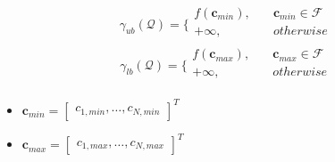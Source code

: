 \documentclass[usenames,dvipsnames]{beamer}
\begin{document}
\begin{frame}{\phantom{Tp}}
  \begin{exampleblock}{\phantom{Tp}}
   \[
     \gamma_{ub}(\mathcal{Q}) = \Bigg\{\begin{array}{ll}f(\mathbf{c}_{min}),\quad &\mathbf{c}_{min}\in\mathcal{F}\\+\infty,\quad &otherwise\\\end{array}	
    \]
    \[
     \gamma_{lb}(\mathcal{Q}) = \Bigg\{\begin{array}{ll}f(\mathbf{c}_{max}),\quad &\mathbf{c}_{max}\in\mathcal{F}\\+\infty,\quad &otherwise\\\end{array}	
     \]
  \end{exampleblock}
  \begin{itemize}
    \item $\mathbf{c}_{min} = \begin{bmatrix}c_{1,min},\dots,c_{N,min}\end{bmatrix}^T$
    \item $\mathbf{c}_{max} = \begin{bmatrix}c_{1,max},\dots,c_{N,max}\end{bmatrix}^T$
  \end{itemize}
\end{frame}
\end{document}
